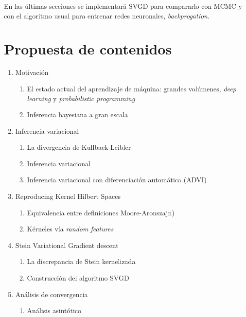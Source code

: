 \documentclass[11pt]{article}
\begin{document}
En las últimas secciones se implementará SVGD para compararlo con MCMC y con el
algoritmo usual para entrenar redes neuronales, \textit{backprogation}.


\section{Propuesta de contenidos}
\begin{enumerate}
	\item Motivación
	\begin{enumerate}[label=1.\arabic*]
		\item El estado actual del aprendizaje de máquina:  grandes volúmenes,
			\textit{deep learning} y \textit{probabilistic programming}
		\item Inferencia bayesiana a gran escala
	\end{enumerate}
	\item Inferencia variacional
	\begin{enumerate}[label=2.\arabic*]
		\item La divergencia de Kullback-Leibler
		\item Inferencia variacional \cite{vi}
\item Inferencia variacional con diferenciación automática (ADVI)
\cite{Kucukelbir2016}
	\end{enumerate}
	\item Reproducing Kernel Hilbert Spaces \cite{Berlinet2009}
	\begin{enumerate}[label=3.\arabic*]
\item Equivalencia entre definiciones %
Moore-Aronszajn)
		\item Kérneles vía \textit{random features} \cite{Rahimi}
	\end{enumerate}
	\item Stein Variational Gradient descent
	\begin{enumerate}[label=4.\arabic*]
\item La discrepancia de Stein kernelizada \cite{kernelized-stein-discrepancy,
measuring-quality}
		\item Construcción del algoritmo SVGD \cite{svgd}
	\end{enumerate}
	\item Análisis de convergencia 
	\begin{enumerate}[label=5.\arabic*]
		\item Análisis asintótico \cite{svgd-gradient-flow, Trillos2017}
		\begin{enumerate}[label=5.1.\arabic*]

\end{enumerate}
\end{enumerate}
\end{enumerate}
\end{document}
